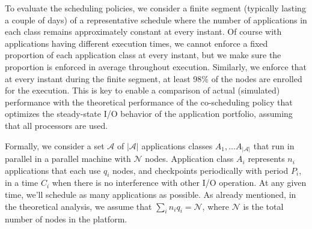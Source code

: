 \documentclass[conference]{IEEEtran}
\newcommand{\appset}{{\mathcal A}}
\newcommand{\nbnodesplat}{{\mathcal N}}
\newcommand{\nbapps}{|{\mathcal A}|}
\newcommand{\app}[1]{A_{#1}}
\newcommand{\nbapp}[1]{n_{#1}}
\newcommand{\nbnodes}[1]{q_{#1}}
\newcommand{\period}[1]{P_{#1}}
\newcommand{\ckpt}[1]{C_{#1}}
\begin{document}
To evaluate the scheduling policies, we consider a finite
    segment (typically lasting a couple of days) of a representative schedule where the number of applications in each class remains approximately constant at every instant. Of course with
    applications having different execution times, we cannot enforce a fixed proportion of each 
    application class at every instant, but we make sure the proportion is enforced in average throughout execution.  Similarly, we enforce that at every instant during the finite segment, 
    at least
    98\% of the nodes
     are enrolled for the execution.
    This is key to enable a comparison of actual (simulated) performance
    with the theoretical performance of the co-scheduling policy that optimizes the steady-state I/O behavior of the
    application portfolio, assuming that all processors are used.
    
Formally, we consider a set $\appset$ of $\nbapps$ applications
classes $\app{1}, \ldots \app{\nbapps}$ that run in parallel in a
parallel machine with $\nbnodesplat$ nodes. Application class
$\app{i}$ represents $\nbapp{i}$ applications that each use
$\nbnodes{i}$ nodes, and checkpoints
periodically with period $\period{i}$, in a time $\ckpt{i}$ when there
is no interference with other I/O operation. At any given time, we'll schedule as many applications as possible. As already mentioned, in the theoretical analysis, we assume that $\sum_{i}\nbapp{i} \nbnodes{i} = \nbnodesplat$, where $\nbnodesplat$ is the total number of nodes in the platform. 

\end{document}

